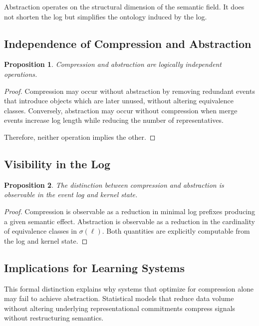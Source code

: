 \documentclass[11pt]{article}
\newtheorem{proposition}{Proposition}[section]
\begin{document}
Abstraction operates on the structural dimension of the semantic field. It
does not shorten the log but simplifies the ontology induced by the log.

\subsection{Independence of Compression and Abstraction}

\begin{proposition}
Compression and abstraction are logically independent operations.
\end{proposition}

\begin{proof}
Compression may occur without abstraction by removing redundant events that
introduce objects which are later unused, without altering equivalence
classes. Conversely, abstraction may occur without compression when merge
events increase log length while reducing the number of representatives.

Therefore, neither operation implies the other.
\end{proof}

\subsection{Visibility in the Log}

\begin{proposition}
The distinction between compression and abstraction is observable in the
event log and kernel state.
\end{proposition}

\begin{proof}
Compression is observable as a reduction in minimal log prefixes producing
a given semantic effect. Abstraction is observable as a reduction in the
cardinality of equivalence classes in $\sigma(\ell)$. Both quantities are
explicitly computable from the log and kernel state.
\end{proof}

\subsection{Implications for Learning Systems}

This formal distinction explains why systems that optimize for compression
alone may fail to achieve abstraction. Statistical models that reduce data
volume without altering underlying representational commitments compress
signals without restructuring semantics.
\end{document}

